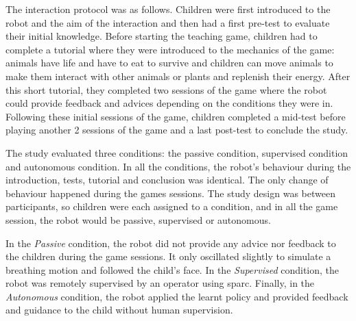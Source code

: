 The interaction protocol was as follows. Children were first introduced to the robot and the aim of the interaction and then had a first pre-test to evaluate their initial knowledge. Before starting the teaching game, children had to complete a tutorial where they were introduced to the mechanics of the game: animals have life and have to eat to survive and children can move animals to make them interact with other animals or plants and replenish their energy. After this short tutorial, they completed two sessions of the game where the robot could provide feedback and advices depending on the conditions they were in. Following these initial sessions of the game, children completed a mid-test before playing another 2 sessions of the game and a last post-test to conclude the study. 


The study evaluated three conditions: the passive condition, supervised condition and autonomous condition. In all the conditions, the robot's behaviour during the introduction, tests, tutorial and conclusion was identical. The only change of behaviour happened during the games sessions. The study design was between participants, so children were each assigned to a condition, and in all the game session, the robot would be passive, supervised or autonomous. %

In the \textit{Passive} condition, the robot did not provide any advice nor feedback to the children during the game sessions. It only oscillated slightly to simulate a breathing motion and followed the child's face. In the \textit{Supervised} condition, the robot was remotely supervised by an operator using \gls{sparc}. Finally, in the \textit{Autonomous} condition, the robot applied the learnt policy and provided feedback and guidance to the child without human supervision.

